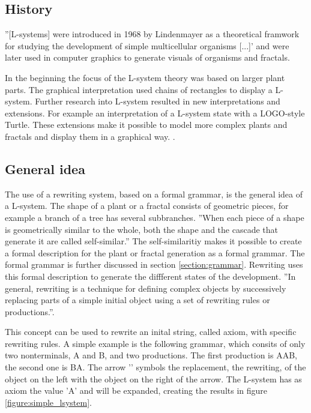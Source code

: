 \documentclass[english]{cpp-hmwk}
\begin{document}
\subsection{History}
\label{section:history}
''[L-systems] were introduced in 1968 by Lindenmayer as a theoretical framwork for studying the development of simple multicellular organisms [...]'\cite[Preface, p.~VI]{prusinkiewiczp.lindenmayera.2004} and were later used in computer graphics to generate visuals of organisms and fractals.

In the beginning the focus of the L-system theory was based on larger plant parts. The graphical interpretation used chains of rectangles to display a L-system. Further research into L-system resulted in new interpretations and extensions. For example an interpretation of a L-system state with a LOGO-style Turtle. These extensions make it possible to model more complex plants and fractals and display them in a graphical way. \cite[Cf. Chapter 1.3, p.~6]{prusinkiewiczp.lindenmayera.2004}.

\subsection{General idea}
\label{section:gerneralidea}
The use of a rewriting system, based on a formal grammar, is the general idea of a L-system. The shape of a plant or a fractal consists of geometric pieces, for example a branch of a tree has several subbranches. ''When each piece of a shape is geometrically similar to the whole, both the shape and the cascade that generate it are called self-similar.''\cite[Chapter 6, p.~34]{benoitmandelbrot1982} The self-similaritiy makes it possible to create a formal description for the plant or fractal generation as a formal grammar. The formal grammar is further discussed in section \ref{section:grammar}. Rewriting uses this formal description to generate the diffferent states of the development. ''In general, rewriting is a technique for defining complex objects by successively replacing parts of a simple initial object using a set of rewriting rules or productions.''\cite[Chapter 1.1,  p.~1]{prusinkiewiczp.lindenmayera.2004}. 

This concept can be used to rewrite an inital string, called axiom, with specific rewriting rules.
A simple example is the following grammar, which consits of only two nonterminals, A and B, and two productions. 
The first production is A\rightarrow AB, the second one is B\rightarrow A. The arrow '\rightarrow' symbols the replacement, the rewriting, of the object on the left with the object on the right of the arrow.
The L-system has as axiom the value 'A' and will be expanded, creating the results in figure \ref{figure:simple_lsystem}.
\end{document}
